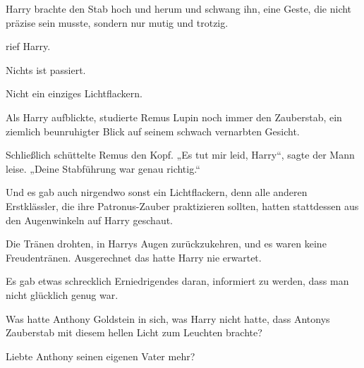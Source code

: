 Harry brachte den Stab hoch und herum und schwang ihn, eine Geste, die nicht präzise sein musste, sondern nur mutig und trotzig.

 rief Harry.

Nichts ist passiert.

Nicht ein einziges Lichtflackern.

Als Harry aufblickte, studierte Remus Lupin noch immer den Zauberstab, ein ziemlich beunruhigter Blick auf seinem schwach vernarbten Gesicht.

Schließlich schüttelte Remus den Kopf. „Es tut mir leid, Harry“, sagte der Mann leise. „Deine Stabführung war genau richtig.“

Und es gab auch nirgendwo sonst ein Lichtflackern, denn alle anderen Erstklässler, die ihre Patronus-Zauber praktizieren sollten, hatten stattdessen aus den Augenwinkeln auf Harry geschaut.

Die Tränen drohten, in Harrys Augen zurückzukehren, und es waren keine Freudentränen. Ausgerechnet das hatte Harry nie erwartet.

Es gab etwas schrecklich Erniedrigendes daran, informiert zu werden, dass man nicht glücklich genug war.

Was hatte Anthony Goldstein in sich, was Harry nicht hatte, dass Antonys Zauberstab mit diesem hellen Licht zum Leuchten brachte?

Liebte Anthony seinen eigenen Vater mehr?


